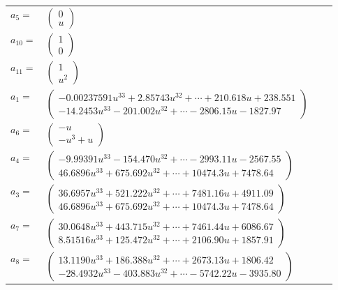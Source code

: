 \documentclass[1p]{elsarticle_modified}
\theoremstyle{definition}
\begin{document}
\begin{tabular}{m{7pt} m{180pt} m{7pt} m{180pt} }
\flushright $a_{5}=$&$\begin{pmatrix}0\\u\end{pmatrix}$ \\
\flushright $a_{10}=$&$\begin{pmatrix}1\\0\end{pmatrix}$ \\
\flushright $a_{11}=$&$\begin{pmatrix}1\\u^2\end{pmatrix}$ \\
\flushright $a_{1}=$&$\begin{pmatrix}-0.00237591 u^{33}+2.85743 u^{32}+\cdots+210.618 u+238.551\\-14.2453 u^{33}-201.002 u^{32}+\cdots-2806.15 u-1827.97\end{pmatrix}$ \\
\flushright $a_{6}=$&$\begin{pmatrix}- u\\- u^3+u\end{pmatrix}$ \\
\flushright $a_{4}=$&$\begin{pmatrix}-9.99391 u^{33}-154.470 u^{32}+\cdots-2993.11 u-2567.55\\46.6896 u^{33}+675.692 u^{32}+\cdots+10474.3 u+7478.64\end{pmatrix}$ \\
\flushright $a_{3}=$&$\begin{pmatrix}36.6957 u^{33}+521.222 u^{32}+\cdots+7481.16 u+4911.09\\46.6896 u^{33}+675.692 u^{32}+\cdots+10474.3 u+7478.64\end{pmatrix}$ \\
\flushright $a_{7}=$&$\begin{pmatrix}30.0648 u^{33}+443.715 u^{32}+\cdots+7461.44 u+6086.67\\8.51516 u^{33}+125.472 u^{32}+\cdots+2106.90 u+1857.91\end{pmatrix}$ \\
\flushright $a_{8}=$&$\begin{pmatrix}13.1190 u^{33}+186.388 u^{32}+\cdots+2673.13 u+1806.42\\-28.4932 u^{33}-403.883 u^{32}+\cdots-5742.22 u-3935.80\end{pmatrix}$ \\

\end{tabular}
\end{document}
